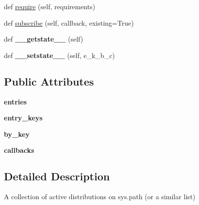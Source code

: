 \begin{DoxyCompactItemize}
\item 
def \hyperlink{classpkg__resources_1_1_working_set_a1c2434f098e08c20314935fddad8426b}{require} (self, requirements)
\item 
def \hyperlink{classpkg__resources_1_1_working_set_a998b3678540dc5f39aa560f347c66d4b}{subscribe} (self, callback, existing=True)
\item 
\mbox{\label{classpkg__resources_1_1_working_set_a576c93da9ba579531e1c0144dc83769b}} 
def {\bfseries \+\_\+\+\_\+getstate\+\_\+\+\_\+} (self)
\item 
\mbox{\label{classpkg__resources_1_1_working_set_ae0f044870f29ce1c4fd06ebaa209cc51}} 
def {\bfseries \+\_\+\+\_\+setstate\+\_\+\+\_\+} (self, e\+\_\+k\+\_\+b\+\_\+c)
\end{DoxyCompactItemize}
\subsection*{Public Attributes}
\begin{DoxyCompactItemize}
\item 
\mbox{\label{classpkg__resources_1_1_working_set_aa9a6eb37900163d92183a1e40a0b52f4}} 
{\bfseries entries}
\item 
\mbox{\label{classpkg__resources_1_1_working_set_afe054ebd8bc27fe61aa90cecadaa9bad}} 
{\bfseries entry\+\_\+keys}
\item 
\mbox{\label{classpkg__resources_1_1_working_set_ac0e359dc968ec95eb2b5aed2988daa36}} 
{\bfseries by\+\_\+key}
\item 
\mbox{\label{classpkg__resources_1_1_working_set_a5b68079da017460c2ad13d6514ae55d7}} 
{\bfseries callbacks}
\end{DoxyCompactItemize}


\subsection{Detailed Description}
\begin{DoxyVerb}A collection of active distributions on sys.path (or a similar list)\end{DoxyVerb}
 

